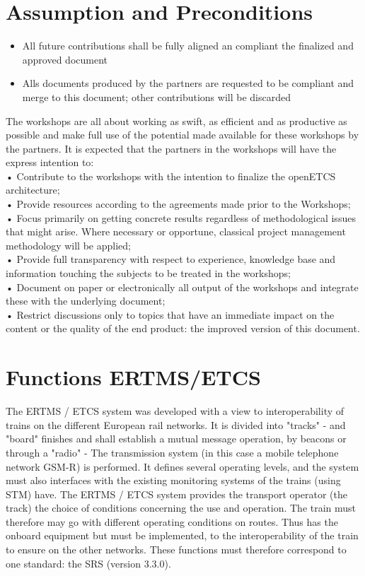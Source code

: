\documentclass{template/openetcs_report}
\begin{document}
\section{Assumption and Preconditions}
\begin{itemize}
\item All future contributions shall be fully aligned an compliant the finalized and approved document 
\item Alls documents produced by the partners are requested to be compliant and merge to this document; other contributions will be discarded
\end{itemize}
The workshops are all about working as swift, as efficient and as productive as possible and make full use of the potential made available for these workshops by the partners. It is expected that the partners in the workshops will have the express intention to:\\
•	Contribute to the workshops with the intention to finalize the openETCS architecture;\\
•	Provide resources according to the agreements made prior to the Workshops;\\
•	Focus primarily on  getting concrete results regardless of methodological issues that might arise. Where necessary or opportune, classical project management methodology will be applied;\\
•	Provide full transparency with respect to experience, knowledge base and information touching the subjects to be treated in the workshops;\\
•	Document on paper or electronically all output of the workshops and integrate these with the underlying document;\\
•	Restrict discussions only to topics that have an immediate impact on the content or the quality of the end product: the improved version of this document.\\


\section{Functions ERTMS/ETCS}
The ERTMS / ETCS system was developed with a view to interoperability of trains on the 
different European rail networks. It is divided into "tracks" - and "board" finishes 
and shall establish a mutual message operation, by beacons or through a "radio" - 
The transmission system (in this case a mobile telephone network GSM-R) is performed. 
It defines several operating levels, and the system must also interfaces with the 
existing monitoring systems of the trains (using \gls{STM}) have. 
The ERTMS / ETCS system provides the transport operator (the track) the choice of conditions 
concerning the use and operation. 
The train must therefore may go with different operating conditions on routes. 
Thus has the onboard equipment but must be implemented, 
to the interoperability of the train to ensure on the other networks. 
These functions must therefore correspond to one standard: the \gls{SRS} (version 3.3.0). 
\end{document}
